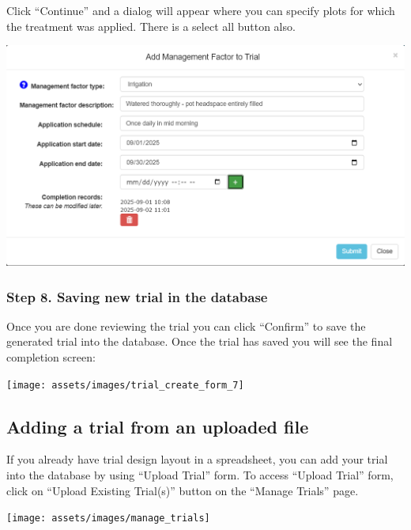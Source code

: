 \documentclass[
  12pt,
]{book}
\begin{document}
Click ``Continue'' and a dialog will appear where you can specify plots for which the treatment was applied. There is a select all button also.

\begin{center}\includegraphics[width=0.95\linewidth]{assets/images/add_management_factor_dialog} \end{center}

\hypertarget{step-8.-saving-new-trial-in-the-database}{%
\subsubsection*{Step 8. Saving new trial in the database}\label{step-8.-saving-new-trial-in-the-database}}


Once you are done reviewing the trial you can click ``Confirm'' to save the generated trial into the database. Once the trial has saved you will see the final completion screen:

\begin{center}\texttt{[image: assets/images/trial\_create\_form\_7]} \end{center}

\hypertarget{adding-a-trial-from-an-uploaded-file}{%
\subsection{Adding a trial from an uploaded file}\label{adding-a-trial-from-an-uploaded-file}}

If you already have trial design layout in a spreadsheet, you can add your trial into the database by using ``Upload Trial'' form. To access ``Upload Trial'' form, click on ``Upload Existing Trial(s)'' button on the ``Manage Trials'' page.

\begin{center}\texttt{[image: assets/images/manage\_trials]} \end{center}
\end{document}
